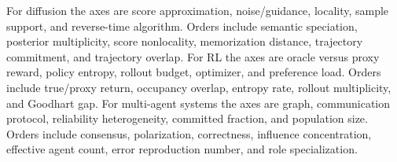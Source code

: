For diffusion the axes are score approximation, noise/guidance, locality, sample support,
and reverse-time algorithm. Orders include semantic speciation, posterior multiplicity,
score nonlocality, memorization distance, trajectory commitment, and trajectory overlap.
For RL the axes are oracle versus proxy reward, policy entropy, rollout budget, optimizer,
and preference load. Orders include true/proxy return, occupancy overlap, entropy rate,
rollout multiplicity, and Goodhart gap. For multi-agent systems the axes are graph,
communication protocol, reliability heterogeneity, committed fraction, and population
size. Orders include consensus, polarization, correctness, influence concentration,
effective agent count, error reproduction number, and role specialization.
